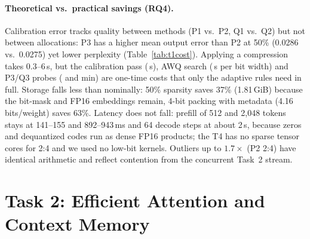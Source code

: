 \documentclass{article}
\begin{document}
\paragraph{Theoretical vs.\ practical savings (RQ4).}
Calibration error tracks quality between methods (P1 vs.\ P2, Q1 vs.\ Q2) but not between allocations: P3 has a higher
mean output error than P2 at 50\% (0.0286 vs.\ 0.0275) yet lower perplexity (Table~\ref{tab:t1cost}). Applying a
compression takes 0.3--6\,s, but the calibration pass (\TOneCalibS\,s), AWQ search (\TOneAwqS\,s per bit width) and P3/Q3
probes (\TOnePThreeProbeMin{} and \TOneQThreeProbeMin{} min) are one-time costs that only the adaptive rules need in full.
Storage falls less than nominally: 50\% sparsity saves 37\% (1.81\,GiB) because the bit-mask and FP16 embeddings remain,
4-bit packing with metadata (4.16 bits/weight) saves 63\%. Latency does not fall: prefill of 512 and 2,048 tokens stays at
141--155 and 892--943\,ms and 64 decode steps at about 2\,s, because zeros and dequantized codes run as dense FP16
products; the T4 has no sparse tensor cores for 2:4 and we used no low-bit kernels. Outliers up to $1.7\times$ (P2 2:4)
have identical arithmetic and reflect contention from the concurrent Task~2 stream.

\section{Task 2: Efficient Attention and Context Memory}
\label{sec:task2}
\end{document}
